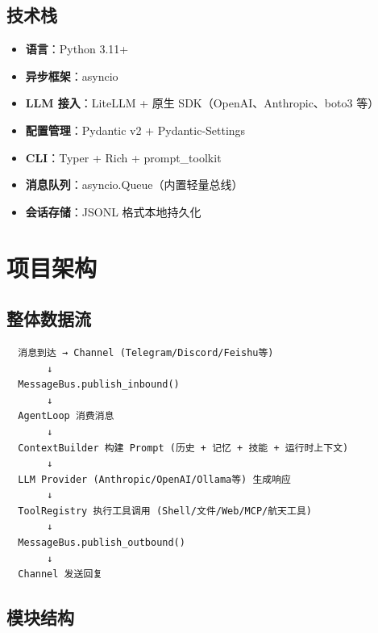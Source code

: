 \documentclass[12pt,a4paper,UTF8]{ctexart}
\begin{document}
\subsection{技术栈}
\begin{itemize}
    \item \textbf{语言}：Python 3.11+
    \item \textbf{异步框架}：asyncio
    \item \textbf{LLM 接入}：LiteLLM + 原生 SDK（OpenAI、Anthropic、boto3 等）
    \item \textbf{配置管理}：Pydantic v2 + Pydantic-Settings
    \item \textbf{CLI}：Typer + Rich + prompt\_toolkit
    \item \textbf{消息队列}：asyncio.Queue（内置轻量总线）
    \item \textbf{会话存储}：JSONL 格式本地持久化
\end{itemize}

\section{项目架构}

\subsection{整体数据流}

\begin{center}
\begin{minipage}{0.95\textwidth}
\begin{verbatim}
  消息到达 → Channel (Telegram/Discord/Feishu等)
       ↓
  MessageBus.publish_inbound()
       ↓
  AgentLoop 消费消息
       ↓
  ContextBuilder 构建 Prompt (历史 + 记忆 + 技能 + 运行时上下文)
       ↓
  LLM Provider (Anthropic/OpenAI/Ollama等) 生成响应
       ↓
  ToolRegistry 执行工具调用 (Shell/文件/Web/MCP/航天工具)
       ↓
  MessageBus.publish_outbound()
       ↓
  Channel 发送回复
\end{verbatim}
\end{minipage}
\end{center}

\subsection{模块结构}
\end{document}
